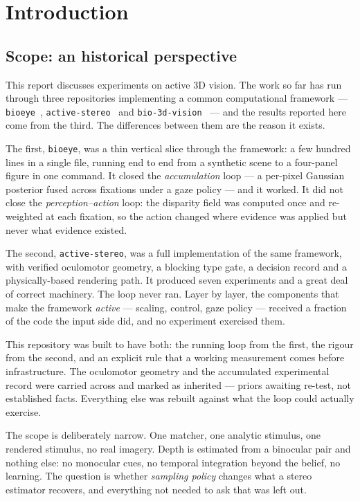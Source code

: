 \section{Introduction}

\subsection{Scope: an historical perspective}

This report discusses experiments on active 3D vision. The work so far has run
through three repositories implementing a common computational framework ---
\texttt{bioeye}~\cite{bioeye}, \texttt{active-stereo}~\cite{activestereo} and
\texttt{bio-3d-vision}~\cite{bio3dvision} --- and the results reported here come
from the third. The differences between them are the reason it exists.

The first, \texttt{bioeye}, was a thin vertical slice through the framework: a
few hundred lines in a single file, running end to end from a synthetic scene to
a four-panel figure in one command. It closed the
\emph{accumulation} loop --- a per-pixel Gaussian posterior fused across
fixations under a gaze policy --- and it worked. It did not close the
\emph{perception--action} loop: the disparity field was computed once and
re-weighted at each fixation, so the action changed where evidence was applied
but never what evidence existed.

The second, \texttt{active-stereo}, was a full implementation of the same
framework, with verified oculomotor geometry, a blocking type gate, a decision
record and a physically-based rendering path. It produced seven experiments and
a great deal of correct machinery. The loop never ran. Layer by layer, the
components that make the framework \emph{active} --- scaling, control, gaze
policy --- received a fraction of the code the input side did, and no experiment
exercised them.

This repository was built to have both: the running loop from the first, the
rigour from the second, and an explicit rule that a working measurement comes
before infrastructure. The oculomotor geometry and the accumulated experimental
record were carried across and marked as inherited --- priors awaiting re-test,
not established facts. Everything else was rebuilt against what the loop could
actually exercise.

The scope is deliberately narrow. One matcher, one analytic stimulus, one
rendered stimulus, no real imagery. Depth is estimated from a binocular pair and
nothing else: no monocular cues, no temporal integration beyond the belief, no
learning. The question is whether \emph{sampling policy} changes what a stereo
estimator recovers, and everything not needed to ask that was left out.

